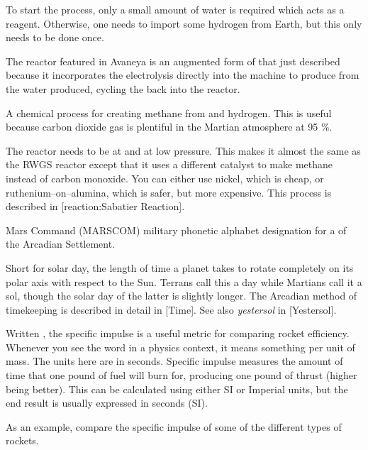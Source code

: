 To start the process, only a small amount of water is required which acts as a reagent. Otherwise, one needs to import some hydrogen from Earth, but this only needs to be done once.

The reactor featured in Avaneya is an augmented form of that just described because it incorporates the electrolysis directly into the machine to produce  from the water produced, cycling the  back into the reactor.

A chemical process for creating methane  from  and hydrogen. This is useful because carbon dioxide gas is plentiful in the Martian atmosphere at 95 \%.

\startformula
{}
\stopformula

The reactor needs to be at  and at low pressure. This makes it almost the same as the RWGS reactor except that it uses a different catalyst to make methane instead of carbon monoxide. You can either use nickel, which is cheap, or ruthenium--on--alumina, which is safer, but more expensive. This process is described in [reaction:Sabatier Reaction].

Mars Command (MARSCOM) military phonetic alphabet designation for a  of the Arcadian Settlement.

Short for solar day, the length of time a planet takes to rotate completely on its polar axis with respect to the Sun. Terrans call this a day while Martians call it a sol, though the solar day of the latter is slightly longer. The Arcadian method of timekeeping is described in detail in [Time]. See also {\it yestersol} in [Yestersol]. 

Written , the specific impulse is a useful metric for comparing rocket efficiency. Whenever you see the word  in a physics context, it means something per unit of mass. The units here are in seconds. Specific impulse measures the amount of time that one pound of fuel will burn for, producing one pound of thrust (higher being better). This can be calculated using either SI or Imperial units, but the end result is usually expressed in seconds (SI).

As an example, compare the specific impulse of some of the different types of rockets.
\crlf

